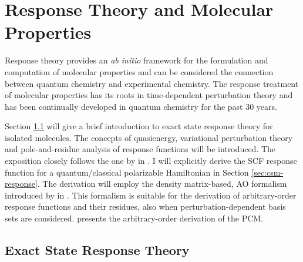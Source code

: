 \chapter{Response Theory and Molecular Properties}\label{ch:molprop}

\begin{epigraphs}
\end{epigraphs}

Response theory provides an \emph{ab initio} framework for the
formulation and computation of molecular properties and can be
considered the connection between quantum chemistry and experimental
chemistry.
The response treatment of molecular properties has its roots in
time-dependent perturbation theory\autocite{Konishi2009-zb} and has been
continually developed in quantum chemistry for the past 30
years.\autocite{Olsen1985-nr, Helgaker1992-ph, Olsen1995-pf,
Christiansen1998-pe, Norman2011-ad, Helgaker2012-cz, Pawlowski2015-sq}

Section \ref{sec:exact-response} will give a brief introduction to exact
state response theory for isolated molecules. The concepts of
quasienergy,\autocite{Christiansen1998-pe} variational perturbation
theory\autocite{Helgaker1992-ph} and pole-and-residue
analysis of response functions\autocite{Olsen1985-nr} will be introduced.
The exposition closely follows the one by \citeauthor{Saue2002-ns}
in .
I will explicitly derive the \acrshort{SCF} response function for a
quantum/classical polarizable Hamiltonian in Section
\ref{sec:csm-response}. The derivation will employ the
density matrix-based, \acrshort{AO} formalism introduced by
\citeauthor{Thorvaldsen2008-sg} in .
This formalism is suitable for the derivation of arbitrary-order
response functions and their residues, also when perturbation-dependent
basis sets are considered.\autocite{Friese2015-kb, Friese2015-bu}
 presents the arbitrary-order derivation of the \acrshort{PCM}.

\section{Exact State Response Theory}\label{sec:exact-response}


